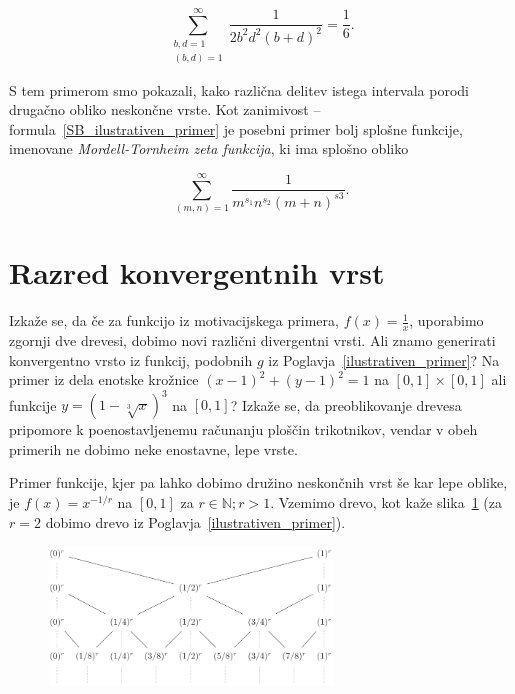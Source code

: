\documentclass[a4paper, 12pt, titlepage]{article}
\begin{document}
\begin{equation}
    \sum_{\substack{b,d=1 \\ (b,d)=1}}^{\infty} \frac{1}{2b^2d^2(b+d)^2} = \frac{1}{6}\text{.}
    \label{SB_ilustrativen_primer}
\end{equation}

S tem primerom smo pokazali, kako različna delitev istega intervala porodi drugačno obliko neskončne vrste. Kot zanimivost -- formula~\eqref{SB_ilustrativen_primer} je posebni primer bolj splošne funkcije, imenovane \emph{Mordell-Tornheim zeta funkcija}, ki ima splošno obliko

\begin{equation*}
    \sum_{(m,n)=1}^{\infty} \frac{1}{m^{s_1}n^{s_2}(m+n)^{s3}}\text{.}
\end{equation*}


\section{Razred konvergentnih vrst}

Izkaže se, da če za funkcijo iz motivacijskega primera, $ f(x) = \frac{1}{x} $, uporabimo zgornji dve drevesi, dobimo novi različni divergentni vrsti. Ali znamo generirati konvergentno vrsto iz funkcij, podobnih $ g $ iz Poglavja~\ref{ilustrativen_primer}? Na primer iz dela enotske krožnice $ (x-1)^2+(y-1)^2=1 $ na $ [0,1] \times [0,1]$ ali funkcije $ y = (1-\sqrt[3]{x})^3 $ na $ [0,1] $? Izkaže se, da preoblikovanje drevesa pripomore k poenostavljenemu računanju ploščin trikotnikov, vendar v obeh primerih ne dobimo neke enostavne, lepe vrste.

Primer funkcije, kjer pa lahko dobimo družino neskončnih vrst še kar lepe oblike, je $ f(x)=x^{-1/r} $ na $ [0,1] $ za $ r \in \mathbb{N}; r > 1 $. Vzemimo drevo, kot kaže slika~\ref{r_drevo} (za $ r = 2 $ dobimo drevo iz Poglavja~\ref{ilustrativen_primer}).

\begin{figure}[H]
    \centering
    \includegraphics[width=0.67\textwidth]{slike/r_drevo.png}
    \caption{}
    \label{r_drevo}
\end{figure}
\end{document}

